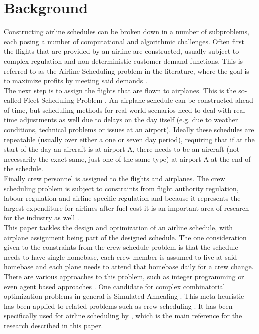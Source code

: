 \documentclass[journal]{IEEEtran}
\begin{document}
\section{Background}
Constructing airline schedules can be broken down in a number of subproblems, each posing a number of computational and algorithmic challenges. Often first the flights that are provided by an airline are constructed, usually subject to complex regulation and non-deterministic customer demand functions. This is referred to as the Airline Scheduling problem in the literature, where the goal is to maximize profits by meeting said demands \cite{Etschmaier1985}. \\
The next step is to assign the flights that are flown to airplanes. This is the so-called Fleet Scheduling Problem \cite{Rushmeier1997}. An airplane schedule can be constructed ahead of time, but scheduling methods for real world scenarios need to deal with real-time adjustments as well due to delays on the day itself (e.g. due to weather conditions, technical problems or issues at an airport). Ideally these schedules are repeatable (usually over either a one or seven day period), requiring that if at the start of the day an aircraft is at airport A, there needs to be an aircraft (not necessarily the exact same, just one of the same type) at airport A at the end of the schedule. \\
Finally crew personnel is assigned to the flights and airplanes. The crew scheduling problem is subject to constraints from flight authority regulation, labour regulation and airline specific regulation and because it represents the largest expenditure for airlines after fuel cost it is an important area of research for the industry as well \cite{Gopalakrishnan2005}.\\
This paper tackles the design and optimization of an airline schedule, with airplane assignment being part of the designed schedule. The one consideration given to the constraints from the crew schedule problem is that the schedule needs to have single homebase, each crew member is assumed to live at said homebase and each plane needs to attend that homebase daily for a crew change.\\
There are various approaches to this problem, such as integer programming \cite{Raff1983} or even agent based approaches \cite{Langerman1997}. One candidate for complex combinatorial optimization problems in general is Simulated Annealing \cite{kirkpatrick1983optimization}. This meta-heuristic has been applied to related problems such as crew scheduling \cite{Sosnowska2001}. It has been specifically used for airline scheduling by \cite{Mashford2001}, which is the main reference for the research described in this paper.
\end{document}
